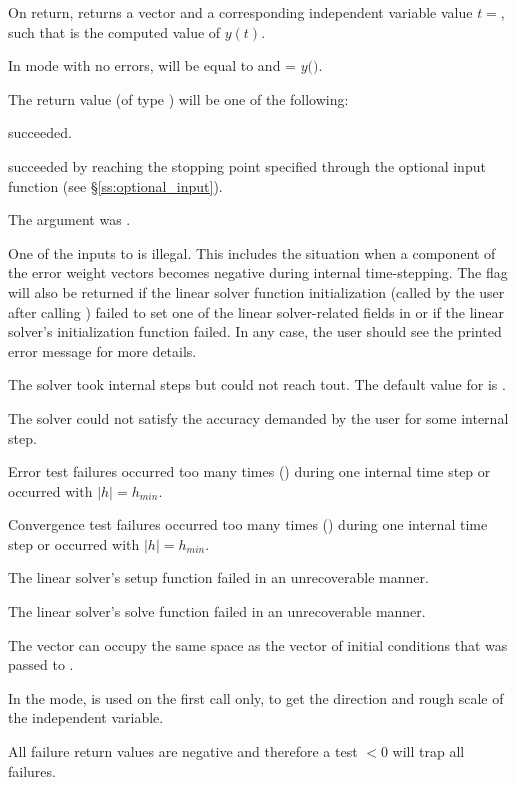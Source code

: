 {
  On return,  returns a vector  and a corresponding 
  independent variable value $t=$, such that  is the computed 
  value of $y(t)$.

  In  mode with no errors,  will be equal to  
  and  = $y($$)$.

  The return value  (of type ) will be one of the following:
  \begin{args}
  \item[\Id{SUCCESS}]
     succeeded.
  \item[\ID{TSTOP\_RETURN}]
     succeeded by reaching the stopping point specified through
    the optional input function  (see \S\ref{ss:optional_input}).
  \item[\ID{CVODE\_NO\_MEM}]
    The  argument was .
  \item[\ID{ILL\_INPUT}]
    One of the inputs to  is illegal. This includes the situation when a 
    component of the error weight vectors becomes negative during internal 
    time-stepping. The  flag will also be returned if the linear 
    solver function initialization (called by the user after calling 
    ) failed to set one of the linear solver-related fields 
    in  or if the linear solver's initialization function failed. 
    In any case, the user should see the printed error message for more details.
  \item[\ID{TOO\_MUCH\_WORK}] 
    The solver took  internal steps but could not reach tout. 
    The default value for  is .
  \item[\ID{TOO\_MUCH\_ACC}] 
    The solver could not satisfy the accuracy demanded by the user for some 
    internal step.
  \item[\ID{ERR\_FAILURE}]
    Error test failures occurred too many times () during one 
    internal time step or occurred with $|h| = h_{min}$.
  \item[\ID{CONV\_FAILURE}] 
    Convergence test failures occurred too many times () during 
    one internal time step or occurred with $|h| = h_{min}$.             
  \item[\ID{SETUP\_FAILURE}] 
    The linear solver's setup function failed in an unrecoverable manner.
  \item[\ID{SOLVE\_FAILURE}] 
    The linear solver's solve function failed in an unrecoverable manner.
  \end{args} 
}
{
  The vector  can occupy the same space as the  vector of 
  initial conditions that was passed to . 

  In the  mode,  is used on the first call only, 
  to get the direction and rough scale of the independent variable.

  All failure return values are negative and therefore a test $< 0$
  will trap all  failures.
}

